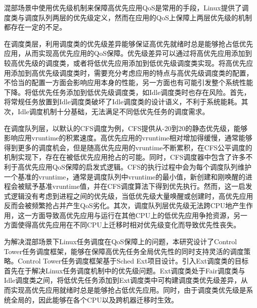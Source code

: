 
混部场景中使用优先级机制来保障高优先应用QoS是常用的手段，Linux提供了调度类与调度队列两层的优先级定义，然而在应用的QoS上保障上两层优先级的机制都存在一定的不足。

在调度类层，利用调度类的优先级差异能够保证高优先就绪时总是能够抢占低优先应用，从而实现高优先应用的QoS保障。优先级差异可以通过将高优先应用添加到较高优先级的调度类，或者将低优先应用添加到低优先级调度类实现。将高优先应用添加到高优先级调度类时，需要充分考虑应用的特点与高优先级调度类的配置，不恰当的配置一方面会影响应用本身的性能，另一方面也有可能引发整个系统性能下降。将低优先任务添加到低优先级调度类，如Idle调度类时也存在风险。首先，将常规任务放置到Idle调度类破坏了Idle调度类的设计语义，不利于系统能耗。其次，Idle调度机制十分基础，无法满足不同低优先任务的调度需求。

在调度队列层，以默认的CFS调度为例，CFS提供从-20到20的静态优先级，能够影响应用vruntime的积累速度。高优先应用的vruntime相对增加得缓慢，通常能够得到更多的调度机会，但是随高优先应用的vruntime不断累积，在CFS公平调度的机制实现下，存在在被低优先应用抢占的可能。同时，CFS调度器中包含了许多不利于高优先应用QoS保障的启发式逻辑。CFS的执行过程中会为每个调度队列维护一个基准的vruntime，通常是调度队列中vruntime的最小值，新创建和刚唤醒的进程会被赋予基准vruntime值，并在CFS调度算法下得到优先执行。然而，这一启发式逻辑没有考虑到进程之间的优先级，当低优先级大量唤醒或创建时，高优先应用反而会被频繁抢占并产生QoS劣化。其次，调度队列层优先级无法跨CPU地产生作用，这一方面导致高优先应用与运行在其他CPU上的低优先应用争抢资源，另一方面使得高优先应用在不同CPU上迁移时相对优先级变化而导致优先性丧失。

为解决混部场景下Linux任务调度在QoS保障上的问题，本研究设计了Control Tower任务调度框架，能够在保障高优先任务全局优先性的同时支持灵活的调度策略。Control Tower任务调度框架基于Sched Ext项目设计。引入Ext调度类的目标首先在于解决Linux任务调度机制中的优先级问题。Ext调度类处于Fair调度类与Idle调度类之间，将低优先任务添加到Ext调度类中可构建调度类优先级差异，从而实现高优先应用就绪时总是能够抢占低优先应用。同时，由于调度类优先级是系统全局的，因此能够在各个CPU以及跨机器迁移时生效。

